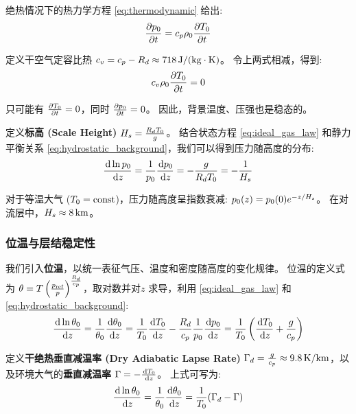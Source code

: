 绝热情况下的热力学方程 \eqref{eq:thermodynamic} 给出:
\begin{equation*}
    \pde{\pressure_0}{\timevar} = \specheat \density_0 \pde{\temperature_0}{\timevar}
\end{equation*}

定义干空气定容比热 $c_v = c_p - R_d \approx 718\,\mathrm{J/(kg \cdot K)}$。
令上两式相减，得到:
\begin{equation*}
    \vspecheat \density_0 \pde{\temperature_0}{\timevar} = 0
\end{equation*}

只可能有 $\pde{\temperature_0}{\timevar} = 0$，同时 $\pde{\pressure_0}{\timevar} = 0$。
因此，背景温度、压强也是稳态的。

定义\textbf{标高 (Scale Height)} $H_s = \frac{R_d T_0}{g}$。
结合状态方程 \eqref{eq:ideal_gas_law} 和静力平衡关系 \eqref{eq:hydrostatic_background}，我们可以得到压力随高度的分布:
\begin{equation}
    \ode{\ln \pressure_0}{z} = \frac{1}{\pressure_0} \frac{\dd{\pressure_0}}{\dd{z}} = -\frac{\gravityconst}{\gasconst \temperature_0} = -\frac{1}{\scaleheight}
    \label{eq:pressure_scale_height}
\end{equation}

对于等温大气 ($T_0 = \text{const}$)，压力随高度呈指数衰减: $p_0(z) = p_0(0) e^{-z/H_s}$。
在对流层中，$H_s \approx 8\,\mathrm{km}$。

\subsubsection{位温与层结稳定性}

我们引入\textbf{位温}，以统一表征气压、温度和密度随高度的变化规律。
位温的定义式为 $\theta = T \left(\frac{p_\text{ref}}{p}\right)^{\frac{R_d}{c_p}}$，取对数并对$z$ 求导，利用 \eqref{eq:ideal_gas_law} 和 \eqref{eq:hydrostatic_background}:
\begin{equation*}
    \ode{\ln \ptemp_0}{z} = \frac{1}{\ptemp_0} \ode{\ptemp_0}{z} = \frac{1}{\temperature_0} \ode{\temperature_0}{z} - \frac{\gasconst}{\specheat} \frac{1}{\pressure_0} \ode{\pressure_0}{z} = \frac{1}{\temperature_0} \left(\ode{\temperature_0}{z} + \frac{\gravityconst}{\specheat}\right)
\end{equation*}

定义\textbf{干绝热垂直减温率 (Dry Adiabatic Lapse Rate)} $\Gamma_d = \frac{g}{c_p} \approx 9.8\,\mathrm{K/km}$，以及环境大气的\textbf{垂直减温率} $\lapse = -\ode{\temperature_0}{z}$。
上式可写为:
\begin{equation}
    \ode{\ln \ptemp_0}{z} = \frac{1}{\ptemp_0} \ode{\ptemp_0}{z} = \frac{1}{\temperature_0} (\drylapse - \lapse)
    \label{eq:stability_criterion}
\end{equation}

